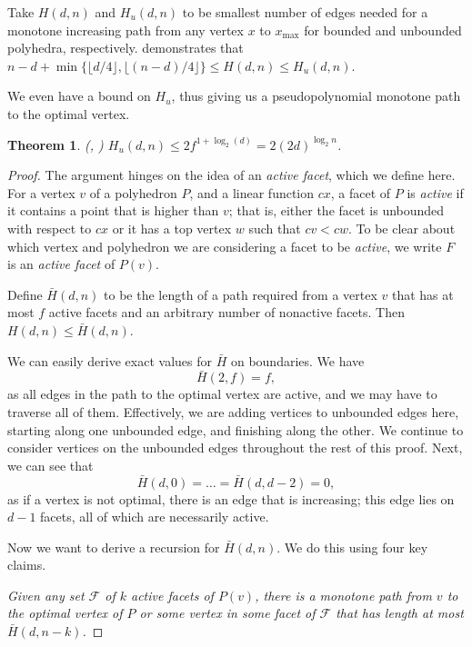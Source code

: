 \documentclass[11pt,a4paper]{article}
\newtheorem{thm}{Theorem}[section]
\theoremstyle{definition}
\begin{document}
Take $H(d,n)$ and $H_u(d,n)$ to be smallest number of edges needed for a monotone increasing path from any vertex $x$ to $x_{\max}$ for bounded and unbounded polyhedra, respectively. \citet{todd80} demonstrates that $n-d+\min\{\lfloor d/4\rfloor,\lfloor(n-d)/4\rfloor\}\le H(d,n)\le H_u(d,n)$.

We even have a bound on $H_u$, thus giving us a pseudopolynomial monotone path to the optimal vertex.
\begin{thm}
\rm{(\citet{kalai92}, \citet{zieg94})} $H_u(d,n)\le 2f^{1+\log_2(d)}=2(2d)^{\log_2{n}}$.
\end{thm}
\begin{proof}
The argument hinges on the idea of an \emph{active facet}, which we define here. For a vertex $v$ of a polyhedron $P$, and a linear function $cx$, a facet of $P$ is \emph{active} if it contains a point that is higher than $v$; that is, either the facet is unbounded with respect to $cx$ or it has a top vertex $w$ such that $cv<cw$. To be clear about which vertex and polyhedron we are considering a facet to be \emph{active}, we write $F$ is an \emph{active facet} of $P(v)$.

Define $\bar{H}(d,n)$ to be the length of a path required from a vertex $v$ that has at most $f$ active facets and an arbitrary number of nonactive facets. Then $H(d,n)\le \bar{H}(d,n)$.

We can easily derive exact values for $\bar{H}$ on boundaries. We have $$\bar{H}(2,f)=f,$$ as all edges in the path to the optimal vertex are active, and we may have to traverse all of them. Effectively, we are adding vertices to unbounded edges here, starting along one unbounded edge, and finishing along the other. We continue to consider vertices on the unbounded edges throughout the rest of this proof. Next, we can see that $$\bar{H}(d,0)=\ldots=\bar{H}(d,d-2)=0,$$ as if a vertex is not optimal, there is an edge that is increasing; this edge lies on $d-1$ facets, all of which are necessarily active.

Now we want to derive a recursion for $\bar{H}(d,n)$. We do this using four key claims.

\emph{Given any set $\mathcal{F}$ of $k$ active facets of $P(v)$, there is a monotone path from $v$ to the optimal vertex of $P$ or some vertex in some facet of $\mathcal{F}$ that has length at most $\bar{H}(d,n-k)$.}


\end{proof}
\end{document}
